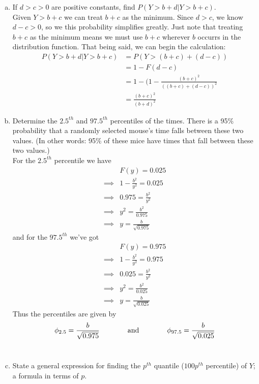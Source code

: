 \documentclass{scrartcl}
\begin{document}
\begin{enumerate}
\begin{enumerate}[a)]
  \item If $d > c > 0$ are positive constants, find $P(Y > b + d | Y > b + c)$.\\
    Given $Y > b+c$ we can treat $b+c$ as the minimum. Since $d>c$, we know $d-c>0$, so we this probability simplifies greatly. Just note that treating $b+c$ as the minimum means we must use $b+c$ wherever $b$ occurrs in the distribution function. That being said, we can begin the calculation:
\begin{align*}
  P(Y>b+d | Y>b+c) &= P(Y>(b+c)+(d-c))\\
  &= 1 - F(d-c)\\
  &= 1 - (1 - \frac{(b+c)^2}{((b+c)+(d-c))^2}\\
  &= \frac{(b+c)^2}{(b+d)^2}
\end{align*}

\item Determine the $2.5^{th}$ and $97.5^{th}$ percentiles of the times. There is a 95\% probability that a randomly selected mouse’s time falls between these two values. (In other words: 95\% of these mice have times that fall between these two values.)\\
For the $2.5^{th}$ percentile we have
\begin{align*}
  &F(y) = 0.025\\
  \implies& 1 - \frac{b^2}{y^2} = 0.025\\
  \implies& 0.975 = \frac{b^2}{y^2}\\
  \implies& y^2 = \frac{b^2}{0.975}\\
  \implies& y = \frac{b}{\sqrt{0.975}}
\end{align*}
and for the $97.5^{th}$ we've got
\begin{align*}
  &F(y) = 0.975\\
  \implies& 1 - \frac{b^2}{y^2} = 0.975\\
  \implies& 0.025 = \frac{b^2}{y^2}\\
  \implies& y^2 = \frac{b^2}{0.025}\\
  \implies& y = \frac{b}{\sqrt{0.025}}
\end{align*}
Thus the percentiles are given by $$ \phi_{2.5} = \frac{b}{\sqrt{0.975}} \text{\hspace{0.5in} and \hspace{0.5in}} \phi_{97.5} = \frac{b}{\sqrt{0.025}}$$\\

\item State a general expression for finding the $p^{th}$ quantile ($100p^{th}$ percentile) of $Y$; a formula in terms of $p$.\\


\end{enumerate}
\end{enumerate}
\end{document}
